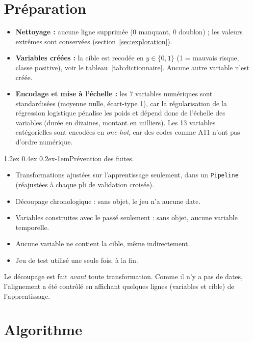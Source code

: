 \documentclass[11pt,a4paper]{article}
\makeatletter
\renewcommand\paragraph{\@startsection{paragraph}{4}{\z@}%
  {1.2ex \@plus 0.4ex \@minus 0.2ex}{-1em}{\normalfont\normalsize\bfseries}}
\makeatother
\begin{document}
\section{Préparation}
\label{sec:preparation}
\begin{itemize}
  \item \textbf{Nettoyage :} aucune ligne supprimée (0 manquant, 0 doublon) ; les valeurs extrêmes sont conservées (section~\ref{sec:exploration}).
  \item \textbf{Variables créées :} la cible est recodée en $y \in \{0,1\}$ (1 = mauvais risque, classe positive), voir le tableau~\ref{tab:dictionnaire}. Aucune autre variable n'est créée.
  \item \textbf{Encodage et mise à l'échelle :} les 7 variables numériques sont standardisées (moyenne nulle, écart-type 1), car la régularisation de la régression logistique pénalise les poids et dépend donc de l'échelle des variables (durée en dizaines, montant en milliers). Les 13 variables catégorielles sont encodées en \emph{one-hot}, car des codes comme A11 n'ont pas d'ordre numérique.
\end{itemize}

\paragraph{Prévention des fuites.}
\begin{itemize}
  \item[$\boxtimes$] Transformations ajustées sur l'apprentissage seulement, dans un \texttt{Pipeline} (réajustées à chaque pli de validation croisée).
  \item[$\square$] Découpage chronologique : sans objet, le jeu n'a aucune date.
  \item[$\square$] Variables construites avec le passé seulement : sans objet, aucune variable temporelle.
  \item[$\boxtimes$] Aucune variable ne contient la cible, même indirectement.
  \item[$\boxtimes$] Jeu de test utilisé une seule fois, à la fin.
\end{itemize}
Le découpage est fait \emph{avant} toute transformation. Comme il n'y a pas de dates, l'alignement a été contrôlé en affichant quelques lignes (variables et cible) de l'apprentissage.

\section{Algorithme}
\label{sec:algorithme}
\end{document}
